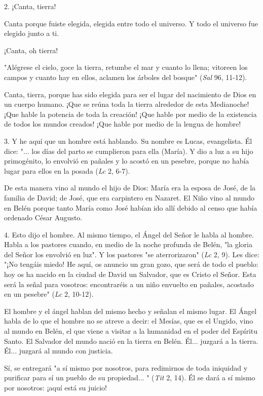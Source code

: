 2. ¡Canta, tierra!

Canta porque fuiste elegida, elegida entre todo el universo. Y todo el
universo fue elegido junto a ti.

¡Canta, oh tierra!

"Alégrese el cielo, goce la tierra, retumbe el mar y cuanto lo llena;
vitoreen los campos y cuanto hay en ellos, aclamen los árboles del
bosque" (\emph{Sal} 96, 11-12).

Canta, tierra, porque has sido elegida para ser el lugar del nacimiento
de Dios en un cuerpo humano. ¡Que se reúna toda la tierra alrededor de
esta Medianoche! ¡Que hable la potencia de toda la creación! ¡Que hable
por medio de la existencia de todos los mundos creados! ¡Que hable por
medio de la lengua de hombre!

3. Y he aquí que un hombre está hablando. Su nombre es Lucas,
evangelista. Él dice: "... los días del parto se cumplieron para ella
(María). Y dio a luz a su hijo primogénito, lo envolvió en pañales y lo
acostó en un pesebre, porque no había lugar para ellos en la posada
(\emph{Lc} 2, 6-7).

De esta manera vino al mundo el hijo de Dios: María era la esposa de
José, de la familia de David; de José, que era carpintero en Nazaret. El
Niño vino al mundo en Belén porque tanto María como José habían ido allí
debido al censo que había ordenado César Augusto.

4. Esto dijo el hombre. Al mismo tiempo, el Ángel del Señor le habla al
hombre. Habla a los pastores cuando, en medio de la noche profunda de
Belén, "la gloria del Señor los envolvió en luz". Y los pastores "se
aterrorizaron" (\emph{Lc} 2, 9). Les dice: "¡No tengáis miedo! He aquí,
os anuncio un gran gozo, que será de todo el pueblo: hoy os ha nacido en
la ciudad de David un Salvador, que es Cristo el Señor. Esta será la
señal para vosotros: encontraréis a un niño envuelto en pañales,
acostado en un pesebre" (\emph{Lc} 2, 10-12).

El hombre y el ángel hablan del mismo hecho y señalan el mismo lugar. El
Ángel habla de lo que el hombre no se atreve a decir: el Mesías, que es
el Ungido, vino al mundo en Belén, el que viene a visitar a la humanidad
en el poder del Espíritu Santo. El Salvador del mundo nació en la tierra
en Belén. Él... juzgará a la tierra. Él... juzgará al mundo con
justicia.

Sí, se entregará "a sí mismo por nosotros, para redimirnos de toda
iniquidad y purificar para sí un pueblo de su propiedad... " (\emph{Tit}
2, 14). Él se dará a sí mismo por nosotros: ¡aquí está su juicio!

